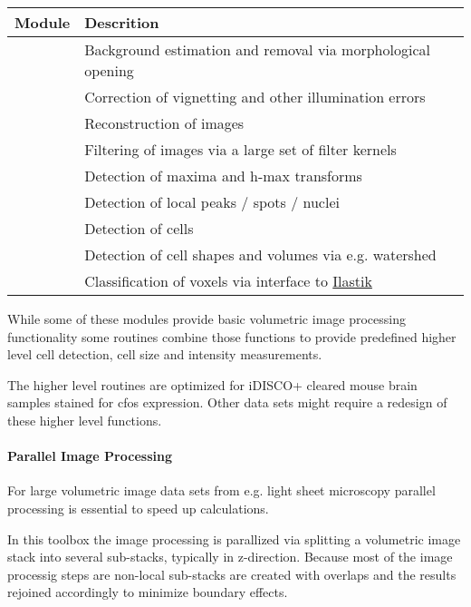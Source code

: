 \documentclass[letterpaper,10pt,english]{sphinxmanual}
\begin{document}
\begin{tabulary}{\linewidth}{|L|L|}
\hline
\textsf{\relax 
Module
} & \textsf{\relax 
Descrition
}\\
\hline
{}
 & 
Background estimation and removal via morphological opening
\\
\hline
{}
 & 
Correction of vignetting and other illumination errors
\\
\hline
{}
 & 
Reconstruction of images
\\
\hline
{\hyperref[api/ClearMap.ImageProcessing.Filter:module-ClearMap.ImageProcessing.Filter]{\emph{}}}
 & 
Filtering of images via a large set of filter kernels
\\
\hline
{}
 & 
Detection of maxima and h-max transforms
\\
\hline
{}
 & 
Detection of local peaks / spots / nuclei
\\
\hline
{}
 & 
Detection of cells
\\
\hline
{}
 & 
Detection of cell shapes and volumes via e.g. watershed
\\
\hline
{}
 & 
Classification of voxels via interface to \href{http://ilastik.org/}{Ilastik}
\\
\hline\end{tabulary}


While some of these modules provide basic volumetric image processing
functionality some routines combine those functions to provide predefined
higher level cell detection, cell size and intensity measurements.

The higher level routines are optimized for iDISCO+ cleared mouse brain samples
stained for cfos expression. Other data sets might require a redesign of these
higher level functions.


\paragraph{Parallel Image Processing}
\label{api/ClearMap.ImageProcessing:parallel-image-processing}
For large volumetric image data sets from e.g. light sheet microscopy
parallel processing is essential to speed up calculations.

In this toolbox the image processing is parallized via splitting a volumetric
image stack into several sub-stacks, typically in z-direction. Because most of
the image processig steps are non-local sub-stacks are created with overlaps
and the results rejoined accordingly to minimize boundary effects.
\end{document}
